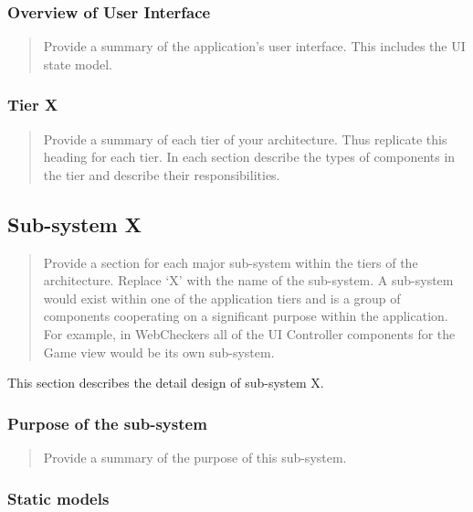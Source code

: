 \documentclass[]{article}
\begin{document}
\subsubsection{Overview of User
Interface}\label{overview-of-user-interface}

\begin{quote}
Provide a summary of the application's user interface. This includes the
UI state model.
\end{quote}

\subsubsection{Tier X}\label{tier-x}

\begin{quote}
Provide a summary of each tier of your architecture. Thus replicate this
heading for each tier. In each section describe the types of components
in the tier and describe their responsibilities.
\end{quote}

\subsection{Sub-system X}\label{sub-system-x}

\begin{quote}
Provide a section for each major sub-system within the tiers of the
architecture. Replace `X' with the name of the sub-system. A sub-system
would exist within one of the application tiers and is a group of
components cooperating on a significant purpose within the application.
For example, in WebCheckers all of the UI Controller components for the
Game view would be its own sub-system.
\end{quote}

This section describes the detail design of sub-system X.

\subsubsection{Purpose of the
sub-system}\label{purpose-of-the-sub-system}

\begin{quote}
Provide a summary of the purpose of this sub-system.
\end{quote}

\subsubsection{Static models}\label{static-models}
\end{document}
